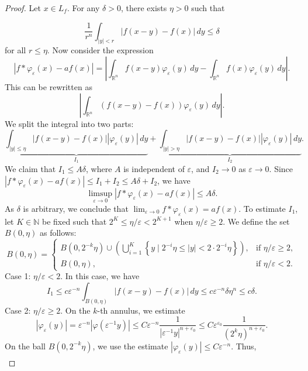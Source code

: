 \documentclass[12pt,openany]{book}
\theoremstyle{definition}
\begin{document}
\begin{proof}
    Let $x \in L_f$. For any $\delta > 0$, there exists $\eta > 0$ such that

$$\frac{1}{r^n} \int_{|y| < r} |f(x-y) - f(x)| \, dy \leq \delta$$
for all $r \leq \eta$. Now consider the expression
$$\left|f * \varphi_{\varepsilon}(x) - a f(x)\right| = \left|\int_{\mathbb{R}^n} f(x-y) \varphi_{\varepsilon}(y) \, dy - \int_{\mathbb{R}^n} f(x) \varphi_{\varepsilon}(y) \, dy\right|.$$
This can be rewritten as
$$\left|\int_{\mathbb{R}^n} (f(x-y) - f(x)) \varphi_{\varepsilon}(y) \, dy\right|.$$
We split the integral into two parts:
$$\underbrace{\int_{|y| \leq \eta} |f(x-y) - f(x)| |\varphi_{\varepsilon}(y)| \, dy}_{I_1} + \underbrace{\int_{|y| > \eta} |f(x-y) - f(x)| |\varphi_{\varepsilon}(y)| \, dy}_{I_2}.$$
We claim that $I_1 \leq A \delta$, where $A$ is independent of $\varepsilon$, and $I_2 \rightarrow 0$ as $\varepsilon \rightarrow 0$. Since $\left|f * \varphi_{\varepsilon}(x)-a f(x)\right| \leqslant I_1+I_2 \leqslant A \delta+I_2$, we have
$$
\limsup _{\varepsilon \rightarrow 0}\left|f * \varphi_{\varepsilon}(x)-a f(x)\right| \leq A \delta.
$$
As $\delta$ is arbitrary, we conclude that $\lim _{\varepsilon \rightarrow 0} f * \varphi_{\varepsilon}(x)=a f(x)$.
To estimate $I_1$, let $K \in \mathbb{N}$ be fixed such that $2^K \leqslant \eta / \varepsilon < 2^{K+1}$ when $\eta / \varepsilon \geqslant 2$. We define the set $B(0, \eta)$ as follows:
$$
B(0, \eta) = 
\begin{cases}
B(0, 2^{-k} \eta) \cup \left(\bigcup_{i=1}^K \left\{ y \mid 2^{-i} \eta \leq |y| < 2 \cdot 2^{-i} \eta \right\}\right), & \text{if } \eta / \varepsilon \geqslant 2, \\
B(0, \eta), & \text{if } \eta / \varepsilon < 2.
\end{cases}
$$
Case 1: $\eta / \varepsilon < 2$. In this case, we have
$$
I_1 \leqslant c \varepsilon^{-n} \int_{B(0, \eta)}|f(x-y)-f(x)| \, dy \leqslant c \varepsilon^{-n} \delta \eta^n \leqslant c \delta.
$$
Case 2: $\eta / \varepsilon \geqslant 2$. On the $k$-th annulus, we estimate
$$
\left|\varphi_{\varepsilon}(y)\right| = \varepsilon^{-n}\left|\varphi\left(\varepsilon^{-1} y\right)\right| \leqslant C \varepsilon^{-n} \frac{1}{\left|\varepsilon^{-1} y\right|^{n+\varepsilon_0}} \leqslant C \varepsilon^{\varepsilon_0} \frac{1}{\left(2^k \eta\right)^{n+\varepsilon_0}}.
$$
On the ball $B\left(0, 2^{-k} \eta\right)$, we use the estimate $\left|\varphi_{\varepsilon}(y)\right| \leqslant C \varepsilon^{-n}$.
Thus,
$$
\begin{aligned}

\end{aligned}$$
\end{proof}
\end{document}
